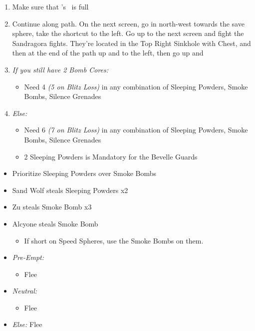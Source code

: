   \begin{enumerate}[resume]
  \item Make sure that \rikku's \od\ is full
  \item Continue along path. On the next screen, go in north-west towards the save sphere, take the shortcut to the left. Go up to the next screen and fight the Sandragora fights. They're located in the Top Right Sinkhole with Chest, and then at the end of the path up and to the left, then go up and \sd
  \item \textit{If you still have 2 Bomb Cores:}
  \begin{itemize}
	\item Need 4 \textit{(5 on Blitz Loss)} in any combination of Sleeping Powders, Smoke Bombs, Silence Grenades
  \end{itemize}
  \item \textit{Else:}
  \begin{itemize}
  	\item Need 6 \textit{(7 on Blitz Loss)} in any combination of Sleeping Powders, Smoke Bombs, Silence Grenades
  	\item 2 Sleeping Powders is Mandatory for the Bevelle Guards
  \end{itemize}
\end{enumerate}
\begin{encounters}
  \begin{itemize}
    \item Prioritize Sleeping Powders over Smoke Bombs
    \item Sand Wolf steals Sleeping Powders x2
    \item Zu steals Smoke Bomb x3
    \item Alcyone steals Smoke Bomb
          \begin{itemize}
            \item If short on Speed Spheres, use the Smoke Bombs on them.
          \end{itemize}
	\item \textit{Pre-Empt:}
	\begin{itemize}
	\tidusf Defend
	\rikkuf Steal
	\auronf Defend
	\item Flee
 	\end{itemize}
 	\item \textit{Neutral:}
 	\begin{itemize}
	\switch{\tidus}{\kimahri}
 	\kimahrif Steal
 	\switch{\rikku}{\tidus}
 	\item Flee
 	\end{itemize}
	\item \textit{Else:} Flee
  \end{itemize}
\end{encounters}

